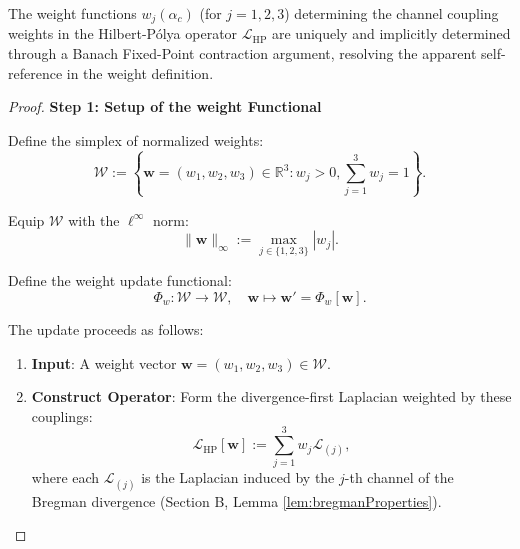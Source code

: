 
\begin{lemma}
\label{lem:weightDeterminationBanachFPT}

The weight functions $w_j(\alpha_c)$ (for $j = 1, 2, 3$) determining the channel coupling weights in the Hilbert-Pólya operator $\mathcal{L}_{\mathrm{HP}}$ are uniquely and implicitly determined through a Banach Fixed-Point contraction argument, resolving the apparent self-reference in the weight definition.

\begin{proof}

\textbf{Step 1: Setup of the weight Functional}

Define the simplex of normalized weights:
\begin{equation}
\mathcal{W} := \left\{ \mathbf{w} = (w_1, w_2, w_3) \in \mathbb{R}^3 : w_j > 0, \sum_{j=1}^3 w_j = 1 \right\}.
\end{equation}

Equip $\mathcal{W}$ with the $\ell^\infty$ norm:
\begin{equation}
\|\mathbf{w}\|_\infty := \max_{j \in \{1,2,3\}} |w_j|.
\end{equation}

Define the weight update functional:
\begin{equation}
\Phi_w : \mathcal{W} \to \mathcal{W}, \quad \mathbf{w} \mapsto \mathbf{w}' = \Phi_w[\mathbf{w}].
\end{equation}

The update proceeds as follows:

\begin{enumerate}

\item[\textbf{(1)}] \textbf{Input}: A weight vector $\mathbf{w} = (w_1, w_2, w_3) \in \mathcal{W}$.

\item[\textbf{(2)}] \textbf{Construct Operator}: Form the divergence-first Laplacian weighted by these couplings:
\begin{equation}
\mathcal{L}_{\mathrm{HP}}[\mathbf{w}] := \sum_{j=1}^3 w_j \mathcal{L}_{(j)},
\end{equation}
where each $\mathcal{L}_{(j)}$ is the Laplacian induced by the $j$-th channel of the Bregman divergence (Section B, Lemma \ref{lem:bregmanProperties}).


\end{enumerate}
\end{proof}
\end{lemma}
